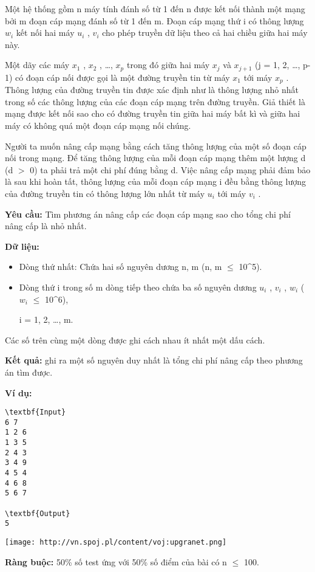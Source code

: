 

Một hệ thống gồm n máy tính đánh số từ 1 đến n được kết nối thành một mạng bởi m đoạn cáp mạng đánh số từ 1 đến m. Đoạn cáp mạng thứ i có thông lượng $w_{i}$ kết nối hai máy $u_{i}$ , $v_{i}$ cho phép truyền dữ liệu theo cả hai chiều giữa hai máy này.

Một dãy các máy $x_{1}$ , $x_{2}$ , …, $x_{p}$ trong đó giữa hai máy $x_{j}$ và $x_{j+1}$ (j = 1, 2, …, p-1) có đoạn cáp nối được gọi là một đường truyền tin từ máy $x_{1}$ tới máy $x_{p}$ . Thông lượng của đường truyền tin được xác định như là thông lượng nhỏ nhất trong số các thông lượng của các đoạn cáp mạng trên đường truyền. Giả thiết là mạng được kết nối sao cho có đường truyền tin giữa hai máy bất kì và giữa hai máy có không quá một đoạn cáp mạng nối chúng.

Người ta muốn nâng cấp mạng bằng cách tăng thông lượng của một số đoạn cáp nối trong mạng. Để tăng thông lượng của mỗi đoạn cáp mạng thêm một lượng d (d $>$ 0) ta phải trả một chi phí đúng bằng d. Việc nâng cấp mạng phải đảm bảo là sau khi hoàn tất, thông lượng của mỗi đoạn cáp mạng i đều bằng thông lượng của đường truyền tin có thông lượng lớn nhất từ máy $u_{i}$ tới máy $v_{i}$ .

\textbf{Yêu cầu: } Tìm phương án nâng cấp các đoạn cáp mạng sao cho tổng chi phí nâng cấp là nhỏ nhất.

\textbf{Dữ liệu: }
\begin{itemize}
	\item Dòng thứ nhất: Chứa hai số nguyên dương n, m (n, m  $\le$  10^5).
\end{itemize}
\begin{itemize}
	\item Dòng thứ i trong số m dòng tiếp theo chứa ba số nguyên dương $u_{i}$ , $v_{i}$ , $w_{i}$ ($w_{i}$  $\le$  10^6),


i = 1, 2, …, m.
\end{itemize}

Các số trên cùng một dòng được ghi cách nhau ít nhất một dấu cách.

\textbf{Kết quả: } ghi ra một số nguyên duy nhất là tổng chi phí nâng cấp theo phương án tìm được.

\textbf{Ví dụ: }\textbf{}
\begin{verbatim}
\textbf{Input}
6 7
1 2 6
1 3 5
2 4 3
3 4 9
4 5 4
4 6 8
5 6 7

\textbf{Output}
5\end{verbatim}


\texttt{[image: http://vn.spoj.pl/content/voj:upgranet.png]}

\textbf{Ràng buộc: } 50\% số test ứng với 50\% số điểm của bài có n  $\le$  100.
